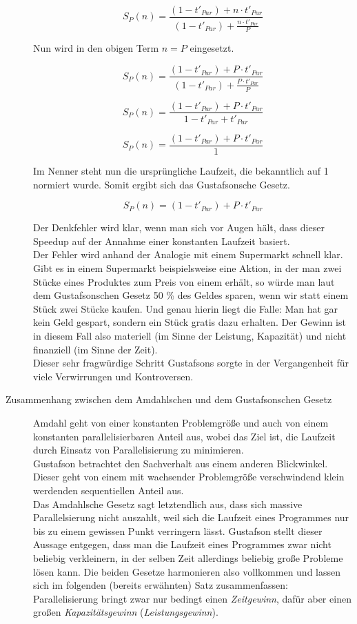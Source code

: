 \begin{description}
					\[ S_P(n) = \frac{(1 - t'_{Par}) + n \cdot t'_{Par}}{(1 - t'_{Par}) + \frac{n \cdot t'_{Par}}{P}} \]
					
					Nun wird in den obigen Term $n = P$ eingesetzt.
					
					\[ S_P(n) = \frac{(1 - t'_{Par}) + P \cdot t'_{Par}}{(1 - t'_{Par}) + \frac{P \cdot t'_{Par}}{P}} \]
					
					\[ S_P(n) = \frac{(1 - t'_{Par}) + P \cdot t'_{Par}}{1 - t'_{Par} + t'_{Par}} \]
					
					\[ S_P(n) = \frac{(1 - t'_{Par}) + P \cdot t'_{Par}}{1} \]
					
					Im Nenner steht nun die ursprüngliche Laufzeit, die bekanntlich auf 1 normiert wurde. Somit ergibt sich das Gustafsonsche Gesetz.
					
					\[ S_P(n) = (1 - t'_{Par}) + P \cdot t'_{Par} \]
					
					Der Denkfehler wird klar, wenn man sich vor Augen hält, dass dieser Speedup auf der Annahme einer konstanten Laufzeit basiert.\\
					Der Fehler wird anhand der Analogie mit einem Supermarkt schnell klar. Gibt es in einem Supermarkt beispielsweise eine Aktion, in der man zwei Stücke eines Produktes zum Preis von einem erhält, so würde man laut dem Gustafsonschen Gesetz 50 \% des Geldes sparen, wenn wir statt einem Stück zwei Stücke kaufen. Und genau hierin liegt die Falle: Man hat gar kein Geld gespart, sondern ein Stück gratis dazu erhalten. Der Gewinn ist in diesem Fall also materiell (im Sinne der Leistung, Kapazität) und nicht finanziell (im Sinne der Zeit).\\
					Dieser sehr fragwürdige Schritt Gustafsons sorgte in der Vergangenheit für viele Verwirrungen und Kontroversen. \cite{GustafsonsGesetzWikipedia} \cite{GesetzeParallelierung}
				
				\item [Zusammenhang zwischen dem Amdahlschen und dem Gustafsonschen Gesetz]
				 
				 Amdahl geht von einer konstanten Problemgröße und auch von einem konstanten parallelisierbaren Anteil aus, wobei das Ziel ist, die Laufzeit durch Einsatz von Parallelisierung zu minimieren.\\
				 Gustafson betrachtet den Sachverhalt aus einem anderen Blickwinkel. Dieser geht von einem mit wachsender Problemgröße verschwindend klein werdenden sequentiellen Anteil aus.\\
				 Das Amdahlsche Gesetz sagt letztendlich aus, dass sich massive Parallelsierung nicht auszahlt, weil sich die Laufzeit eines Programmes nur bis zu einem gewissen Punkt verringern lässt. Gustafson stellt dieser Aussage entgegen, dass man die Laufzeit eines Programmes zwar nicht beliebig verkleinern, in der selben Zeit allerdings beliebig große Probleme lösen kann. Die beiden Gesetze harmonieren also vollkommen und lassen sich im folgenden (bereits erwähnten) Satz zusammenfassen:\\
				 Parallelisierung bringt zwar nur bedingt einen \textit{Zeitgewinn}, dafür aber einen großen \textit{Kapazitätsgewinn} (\textit{Leistungsgewinn}). \cite{GesetzeParallelierung}
			\end{description}